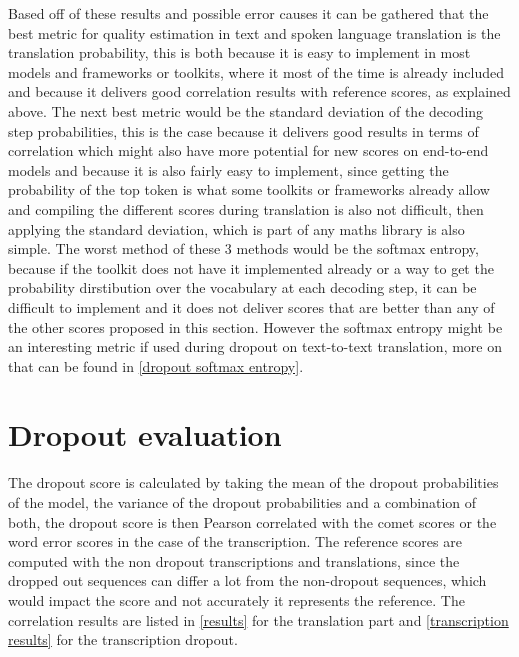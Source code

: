 Based off of these results and possible error causes it can be gathered that the best metric for quality estimation in text and spoken language translation is the translation probability, this is both because it is easy to implement in most models and frameworks or toolkits, where it most of the time is already included and because it delivers good correlation results with reference scores, as explained above.
The next best metric would be the standard deviation of the decoding step probabilities, this is the case because it delivers good results in terms of correlation which might also have more potential for new scores on end-to-end models and because it is also fairly easy to implement, since getting the probability of the top token is what some toolkits or frameworks already allow and compiling the different scores during translation is also not difficult, then applying the standard deviation, which is part of any maths library is also simple. 
The worst method of these 3 methods would be the softmax entropy, because if the toolkit does not have it implemented already or a way to get the probability dirstibution over the vocabulary at each decoding step, it can be difficult to implement and it does not deliver scores that are better than any of the other scores proposed in this section. However the softmax entropy might be an interesting metric if used during dropout on text-to-text translation, more on that can be found in \autoref{dropout softmax entropy}.

\section{Dropout evaluation}
The dropout score is calculated by taking the mean of the dropout probabilities of the model, the variance of the dropout probabilities and a combination of both, the dropout score is then Pearson correlated with the comet scores or the word error scores in the case of the transcription. 
The reference scores are computed with the non dropout transcriptions and translations, since the dropped out sequences can differ a lot from the non-dropout sequences, which would impact the score and not accurately it represents the reference. 
The correlation results are listed in \autoref{results} for the translation part and \autoref{transcription results} for the transcription dropout. 

